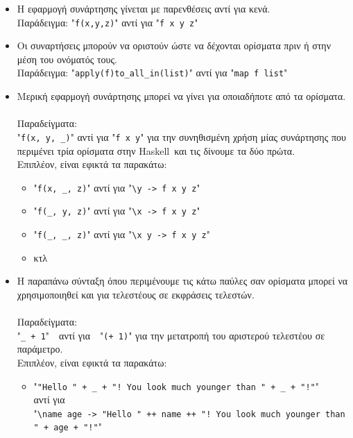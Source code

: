 \documentclass[diploma]{softlab-thesis}
\def\H{Haskell}
\begin{document}
\begin{itemize}

\item
Η εφαρμογή συνάρτησης γίνεται με παρενθέσεις αντί για κενά. \\
Παράδειγμα: "\verb|f(x,y,z)|" αντί για "\verb|f x y z|"

\item
Οι συναρτήσεις μπορούν να οριστούν ώστε να δέχονται ορίσματα πριν ή στην
μέση του ονόματός τους. \\
Παράδειγμα:
"\verb|apply(f)to_all_in(list)|" αντί για "\verb|map f list|"

\item
Μερική εφαρμογή συνάρτησης μπορεί να γίνει για οποιαδήποτε από τα ορίσματα.
\\\\
Παραδείγματα:\\
"\verb|f(x, y, _)|" αντί για "\verb|f x y|" για την συνηθισμένη χρήση μίας
συνάρτησης που περιμένει τρία ορίσματα στην \H\ και τις δίνουμε τα δύο πρώτα.
\\
Επιπλέον, είναι εφικτά τα παρακάτω:

\begin{itemize}

\item
"\verb|f(x, _, z)|" αντί για "\verb|\y -> f x y z|"

\item
"\verb|f(_, y, z)|" αντί για "\verb|\x -> f x y z|"

\item
"\verb|f(_, _, z)|" αντί για "\verb|\x y -> f x y z|"

\item
κτλ

\end{itemize}

\item
Η παραπάνω σύνταξη όπου περιμένουμε τις κάτω παύλες σαν ορίσματα μπορεί να
χρησιμοποιηθεί και για τελεστέους σε εκφράσεις τελεστών.
\\\\
Παραδείγματα:\\
"\verb|_ + 1|"\ \ αντί για\ \  "\verb|(+ 1)|" για την μετατροπή του αριστερού
τελεστέου σε παράμετρο.
\\
Επιπλέον, είναι εφικτά τα παρακάτω:

\begin{itemize}


\item
"\verb|"Hello " + _ + "! You look much younger than " + _ + "!"|"
\\ αντί για \\
"\verb|\name age -> "Hello " ++ name ++ "! You look much younger than " + age + "!"|"


\end{itemize}
\end{itemize}
\end{document}
